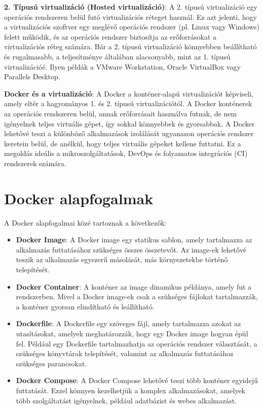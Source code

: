 \textbf{2. Típusú virtualizáció (Hosted virtualizáció)}: A 2. típusú virtualizáció egy operációs rendszeren belül futó virtualizációs réteget használ. Ez azt jelenti, hogy a virtualizációs szoftver egy meglévő operációs rendszer (pl. Linux vagy Windows) felett működik, és az operációs rendszer biztosítja az erőforrásokat a virtualizációs réteg számára. Bár a 2. típusú virtualizáció könnyebben beállítható és rugalmasabb, a teljesítménye általában alacsonyabb, mint az 1. típusú virtualizációé. Ilyen példák a VMware Workstation, Oracle VirtualBox vagy Parallels Desktop.

\textbf{Docker és a virtualizáció}: A Docker a konténer-alapú virtualizációt képviseli, amely eltér a hagyományos 1. és 2. típusú virtualizációtól. A Docker konténerek az operációs rendszeren belül, annak erőforrásait használva futnak, de nem igényelnek teljes virtuális gépet, így sokkal könnyebbek és gyorsabbak. A Docker lehetővé teszi a különböző alkalmazások izolálását ugyanazon operációs rendszer keretein belül, de anélkül, hogy teljes virtuális gépeket kellene futtatni. Ez a megoldás ideális a mikroszolgáltatások, DevOps és folyamatos integrációs (CI) rendszerek számára.

\newpage
\section{Docker alapfogalmak}

A Docker alapfogalmai közé tartoznak a következők:

\begin{itemize}
	\item \textbf{Docker Image}: A Docker image egy statikus sablon, amely tartalmazza az alkalmazás futtatásához szükséges összes összetevőt. Az image-ek lehetővé teszik az alkalmazás egyszerű másolását, más környezetekbe történő telepítését.
	\item \textbf{Docker Container}: A konténer az image dinamikus példánya, amely fut a rendszerben. Mivel a Docker image-ek csak a szükséges fájlokat tartalmazzák, a konténer gyorsan elindítható és leállítható.
	\item \textbf{Dockerfile}: A Dockerfile egy szöveges fájl, amely tartalmazza azokat az utasításokat, amelyek meghatározzák, hogy egy Docker image hogyan épül fel. Például egy Dockerfile tartalmazhatja az operációs rendszer választását, a szükséges könyvtárak telepítését, valamint az alkalmazás futtatásához szükséges parancsokat.
	\item \textbf{Docker Compose}: A Docker Compose lehetővé teszi több konténer egyidejű futtatását. Ezzel könnyen kezelhetjük a komplex alkalmazásokat, amelyek több szolgáltatást igényelnek, például adatbázist és webes alkalmazást.
\end{itemize}

